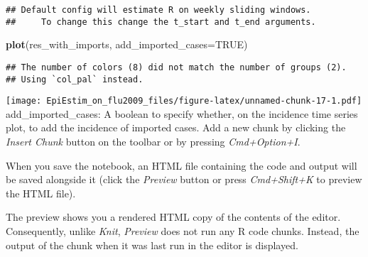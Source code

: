 \documentclass[
]{article}
\newenvironment{Shaded}{\begin{snugshade}}{\end{snugshade}}
\newcommand{\AttributeTok}[1]{\textcolor[rgb]{0.13,0.29,0.53}{#1}}
\newcommand{\ConstantTok}[1]{\textcolor[rgb]{0.56,0.35,0.01}{#1}}
\newcommand{\FunctionTok}[1]{\textcolor[rgb]{0.13,0.29,0.53}{\textbf{#1}}}
\newcommand{\NormalTok}[1]{#1}
\begin{document}
\begin{verbatim}
## Default config will estimate R on weekly sliding windows.
##     To change this change the t_start and t_end arguments.
\end{verbatim}

\begin{Shaded}
\begin{Highlighting}[]
\FunctionTok{plot}\NormalTok{(res\_with\_imports, }\AttributeTok{add\_imported\_cases=}\ConstantTok{TRUE}\NormalTok{) }
\end{Highlighting}
\end{Shaded}

\begin{verbatim}
## The number of colors (8) did not match the number of groups (2).
## Using `col_pal` instead.
\end{verbatim}

\texttt{[image: EpiEstim\_on\_flu2009\_files/figure-latex/unnamed-chunk-17-1.pdf]}
add\_imported\_cases: A boolean to specify whether, on the incidence
time series plot, to add the incidence of imported cases. Add a new
chunk by clicking the \emph{Insert Chunk} button on the toolbar or by
pressing \emph{Cmd+Option+I}.

When you save the notebook, an HTML file containing the code and output
will be saved alongside it (click the \emph{Preview} button or press
\emph{Cmd+Shift+K} to preview the HTML file).

The preview shows you a rendered HTML copy of the contents of the
editor. Consequently, unlike \emph{Knit}, \emph{Preview} does not run
any R code chunks. Instead, the output of the chunk when it was last run
in the editor is displayed.
\end{document}
